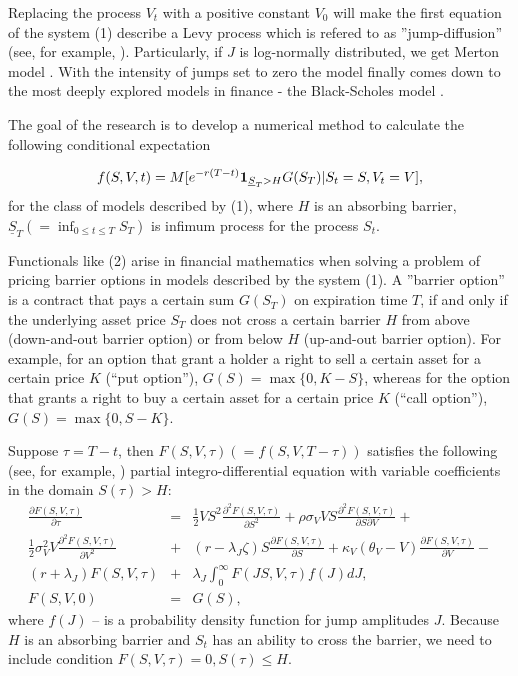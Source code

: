 \documentclass[a4paper]{jpconf}
\begin{document}
Replacing the process $V_t$ with a positive constant $V_0$ will make the first equation of the system (1) describe a Levy process which is refered to as ''jump-diffusion'' (see, for example, \cite{cont_tankov}). Particularly, if $J$ is log-normally distributed, we get Merton model \cite{merton}. With the intensity of jumps set to zero the model finally comes down to the most deeply explored models in finance - the Black-Scholes model \cite{b_s}.

The goal of the research is to develop a numerical method to calculate the following conditional expectation

\begin{equation}
f(S,V,t) = M[e^{-r(T-t)}  {\bf 1}_{\underline{S}_T>H} G(S_T) | S_t = S, V_t = V],
\end{equation}
for the class of models described by (1), where $H$ is an absorbing barrier, $\underline{S}_T (= \inf_{0\le t\le T}S_T)$ is infimum process for the process $S_t$. 

Functionals like (2) arise in financial mathematics when solving a problem of pricing barrier options in models described by the system (1).
A ''barrier option'' is a contract that pays a certain sum $G(S_T)$ on expiration time $T$, if and only if the underlying asset price $S_T$ does not cross a certain barrier $H$ from above (down-and-out barrier option) or from below $H$ (up-and-out barrier option). For example, for an option that grant a holder a right to sell a certain asset for a certain price $K$ (``put option''), $G(S)=\max\{0, K - S\}$, whereas for the option that grants a right to buy a certain asset for a certain price $K$ (``call option''), $G(S)=\max\{0, S - K\}$.

Suppose $\tau = T-t$, then $F(S,V,\tau)\left(=f(S,V, T-\tau)\right)$ satisfies the following (see, for example, \cite{feng}) partial integro-differential equation with variable coefficients in the domain $S(\tau) > H$:
\begin{eqnarray*}
	\frac{\partial F(S,V,\tau)}{\partial \tau} &= &
	\frac{1}{2} VS^2 \frac{\partial^2 F(S,V,\tau)}{\partial S^2} +
	\rho\sigma_V VS \frac{\partial^2 F(S,V,\tau)}{\partial S \partial V} +
	\\
	\frac{1}{2} \sigma_V^2 V \frac{\partial^2 F(S,V,\tau)}{\partial V^2} &+&
	(r - \lambda_J \zeta) S \frac{\partial F(S,V,\tau)}{\partial S} +
	\kappa_V(\theta_V - V) \frac{\partial F(S,V,\tau)}{\partial V} - 
	\\
	(r+\lambda_J)F(S,V,\tau) &+&
	\lambda_J \int_0^\infty F(JS,V,\tau) f(J) dJ,
	\\
	F(S,V,0) &=& G(S),
\end{eqnarray*}
where $f(J)$ -- is a probability density function for jump amplitudes $J$. Because $H$ is an absorbing barrier and $S_t$ has an ability to cross the barrier, we need to include condition $F(S,V,\tau) = 0,  S(\tau) \le H$.
\end{document}
